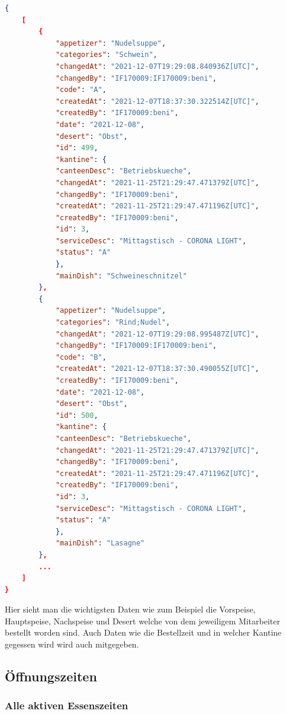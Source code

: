 \begin{lstlisting}[language=json,firstnumber=1]
{
    [
        {
            "appetizer": "Nudelsuppe",
            "categories": "Schwein",
            "changedAt": "2021-12-07T19:29:08.840936Z[UTC]",
            "changedBy": "IF170009:IF170009:beni",
            "code": "A",
            "createdAt": "2021-12-07T18:37:30.322514Z[UTC]",
            "createdBy": "IF170009:beni",
            "date": "2021-12-08",
            "desert": "Obst",
            "id": 499,
            "kantine": {
            "canteenDesc": "Betriebskueche",
            "changedAt": "2021-11-25T21:29:47.471379Z[UTC]",
            "changedBy": "IF170009:beni",
            "createdAt": "2021-11-25T21:29:47.471196Z[UTC]",
            "createdBy": "IF170009:beni",
            "id": 3,
            "serviceDesc": "Mittagstisch - CORONA LIGHT",
            "status": "A"
            },
            "mainDish": "Schweineschnitzel"
        },
        {
            "appetizer": "Nudelsuppe",
            "categories": "Rind;Nudel",
            "changedAt": "2021-12-07T19:29:08.995487Z[UTC]",
            "changedBy": "IF170009:IF170009:beni",
            "code": "B",
            "createdAt": "2021-12-07T18:37:30.490055Z[UTC]",
            "createdBy": "IF170009:beni",
            "date": "2021-12-08",
            "desert": "Obst",
            "id": 500,
            "kantine": {
            "canteenDesc": "Betriebskueche",
            "changedAt": "2021-11-25T21:29:47.471379Z[UTC]",
            "changedBy": "IF170009:beni",
            "createdAt": "2021-11-25T21:29:47.471196Z[UTC]",
            "createdBy": "IF170009:beni",
            "id": 3,
            "serviceDesc": "Mittagstisch - CORONA LIGHT",
            "status": "A"
            },
            "mainDish": "Lasagne"
        },
        ...
    ]
}
\end{lstlisting}

Hier sieht man die wichtigsten Daten wie zum Beispiel die Vorspeise, Hauptspeise, Nachspeise und Desert welche von dem jeweiligem Mitarbeiter bestellt worden sind. 
Auch Daten wie die Bestellzeit und in welcher Kantine gegessen wird wird auch mitgegeben.

\subsection{Öffnungszeiten}

\subsubsection{Alle aktiven Essenszeiten}

